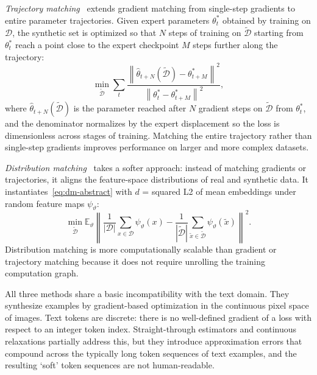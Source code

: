 \documentclass[12pt, a4paper, twoside]{book}
\numberwithin{equation}{chapter}
\theoremstyle{plain}
\theoremstyle{definition}
\theoremstyle{remark}
\newenvironment{foldable}{}{}
\begin{document}
\begin{foldable}
  \textit{Trajectory matching}~\cite{cazenavette2022dataset,kim2022dataset} extends gradient matching from single-step gradients to entire parameter trajectories.
  Given expert parameters $\theta^*_t$ obtained by training on $\mathcal{D}$, the synthetic set is optimized so that $N$ steps of training on $\tilde{\mathcal{D}}$ starting from $\theta^*_t$ reach a point close to the expert checkpoint $M$ steps further along the trajectory:
  \begin{equation}
    \min_{\tilde{\mathcal{D}}} \sum_{t} \frac{\left\| \hat\theta_{t+N}(\tilde{\mathcal{D}}) - \theta^*_{t+M} \right\|^2}{\left\| \theta^*_t - \theta^*_{t+M} \right\|^2},
    \label{eq:mtt-objective}
  \end{equation}
  where $\hat\theta_{t+N}(\tilde{\mathcal{D}})$ is the parameter reached after $N$ gradient steps on $\tilde{\mathcal{D}}$ from $\theta^*_t$, and the denominator normalizes by the expert displacement so the loss is dimensionless across stages of training.
  Matching the entire trajectory rather than single-step gradients improves performance on larger and more complex datasets.
\end{foldable}

\begin{foldable}
  \textit{Distribution matching}~\cite{zhao2023dataset,wang2022cafe} takes a softer approach: instead of matching gradients or trajectories, it aligns the feature-space distributions of real and synthetic data.
  It instantiates~\eqref{eq:dm-abstract} with $d$ = squared L2 of mean embeddings under random feature maps $\psi_\vartheta$:
  \begin{equation}
    \min_{\tilde{\mathcal{D}}} \mathbb{E}_\vartheta \left\| \frac{1}{|\mathcal{D}|} \sum_{x \in \mathcal{D}} \psi_\vartheta(x) - \frac{1}{|\tilde{\mathcal{D}}|} \sum_{\tilde{x} \in \tilde{\mathcal{D}}} \psi_\vartheta(\tilde{x}) \right\|^2.
    \label{eq:dm-objective}
  \end{equation}
  Distribution matching is more computationally scalable than gradient or trajectory matching because it does not require unrolling the training computation graph.
\end{foldable}

\begin{foldable}
  All three methods share a basic incompatibility with the text domain.
  They synthesize examples by gradient-based optimization in the continuous pixel space of images.
  Text tokens are discrete: there is no well-defined gradient of a loss with respect to an integer token index.
  Straight-through estimators and continuous relaxations partially address this, but they introduce approximation errors that compound across the typically long token sequences of text examples, and the resulting `soft' token sequences are not human-readable.
\end{foldable}
\end{document}
